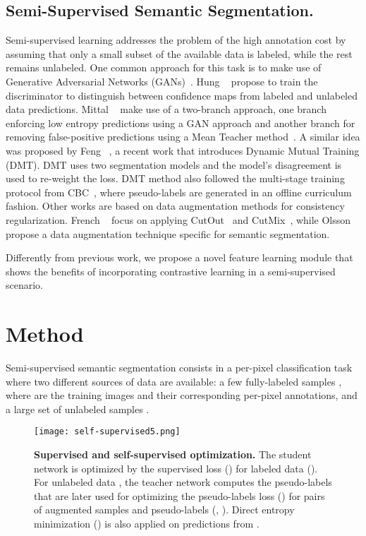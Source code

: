 \documentclass[10pt,twocolumn,letterpaper]{article}
\begin{document}
\subsection{Semi-Supervised Semantic Segmentation.}
Semi-supervised learning addresses the problem of the high annotation cost by assuming that only a small subset of the available data is labeled, while the rest remains unlabeled. One common approach for this task is to make use of Generative Adversarial Networks (GANs)~\cite{goodfellow2014generative}. Hung \etal~\cite{hung2018adversarial} propose to train the discriminator to distinguish between confidence maps from labeled and unlabeled data predictions. Mittal \etal~\cite{mittal2019semi} make use of a two-branch approach, one branch enforcing low entropy predictions using a GAN approach and another branch for removing false-positive predictions using a Mean Teacher method~\cite{tarvainenweight}.
A similar idea was proposed by Feng \etal~\cite{feng2020semi}, a recent work that introduces Dynamic Mutual Training (DMT). DMT uses two segmentation models and the model's disagreement is used to re-weight the loss. DMT method also followed the multi-stage training protocol from CBC~\cite{feng2020semiCBC}, where pseudo-labels are generated in an offline curriculum fashion.
Other works are based on data augmentation methods for consistency regularization. French \etal~\cite{french2019semi} focus on applying CutOut~\cite{devries2017cutout} and CutMix~\cite{yun2019cutmix}, while Olsson \etal~\cite{olsson2021classmix} propose a data augmentation technique specific for semantic segmentation.

Differently from previous work, we propose a novel feature learning module that shows the benefits of incorporating contrastive learning in a semi-supervised scenario. 







\section{Method}
Semi-supervised semantic segmentation consists in a per-pixel classification task where two different sources of data are available: a few fully-labeled samples , where  are the training images and  their corresponding per-pixel annotations, and a large set of unlabeled samples .

\begin{figure}[!tb]
\centering
\texttt{[image: self-supervised5.png]}
\caption{
\textbf{Supervised and self-supervised optimization.} The student network  is optimized by the supervised loss () for labeled data (). For unlabeled data , the teacher network  computes the pseudo-labels  that are later used for optimizing the  pseudo-labels loss () for pairs of augmented samples and pseudo-labels (, ). Direct entropy minimization () is also applied on predictions from .} 
\label{fig:self-training}
\end{figure}
\end{document}
